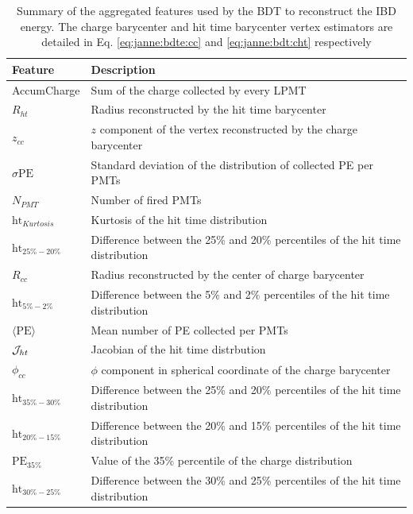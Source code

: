 \documentclass[../main.tex]{subfiles}
\begin{document}
\begin{table}[ht]
  \centering
  \begin{tabular}{|l | l|}
    \hline
    Feature & Description \\
    \hline
    AccumCharge             & Sum of the charge collected by every LPMT \\
    $R_{ht}               $ & Radius reconstructed by the hit time barycenter  \\
    $z_{cc}               $ & $z$ component of the vertex reconstructed by the charge barycenter \\
    $\sigma \text{PE}     $ & Standard deviation of the distribution of collected PE per PMTs \\
    $N_{PMT}              $ & Number of fired PMTs \\
    $\text{ht}_{Kurtosis} $ & Kurtosis of the hit time distribution \\
    $\text{ht}_{25\%-20\%}$ & Difference between the 25\% and 20\% percentiles of the hit time distribution \\
    $R_{cc}               $ & Radius reconstructed by the center of charge barycenter \\
    $\text{ht}_{5\%-2\%}  $ & Difference between the 5\% and 2\% percentiles of the hit time distribution \\
    $\langle \text{PE} \rangle$ & Mean number of PE collected per PMTs \\
    ${\cal J}_{ht}        $ & Jacobian of the hit time distrbution \\
    $\phi_{cc}            $ & $\phi$ component in spherical coordinate of the charge barycenter \\
    $\text{ht}_{35\%-30\%}$ & Difference between the 25\% and 20\% percentiles of the hit time distribution \\
    $\text{ht}_{20\%-15\%}$ & Difference between the 20\% and 15\% percentiles of the hit time distribution \\
    $\text{PE}_{35\%}     $ & Value of the 35\% percentile of the charge distribution \\
    $\text{ht}_{30\%-25\%}$ & Difference between the 30\% and 25\% percentiles of the hit time distribution \\
    \hline
  \end{tabular}
  \caption{Summary of the aggregated features used by the BDT to reconstruct the IBD energy. The charge barycenter and hit time barycenter vertex estimators are detailed in Eq. \ref{eq:janne:bdte:cc} and \ref{eq:janne:bdt:cht} respectively}
  \label{tab:janne:bdte:features}
\end{table}
\end{document}
